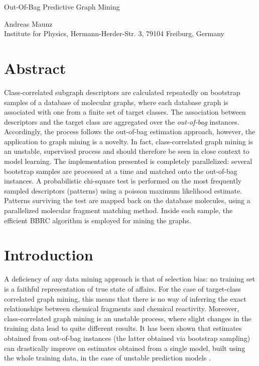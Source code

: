 \documentclass{article}
\begin{document}

\begin{center}
\begin{huge}Out-Of-Bag Predictive Graph Mining\end{huge}

Andreas Maunz \\Institute for Physics, Hermann-Herder-Str. 3, 79104 Freiburg, Germany
\end{center}

\section{Abstract}
Class-correlated subgraph descriptors are calculated repeatedly on bootstrap samples of a database of molecular graphs, where each database graph is associated with one from a finite set of target classes. 
The association between descriptors and the target class are aggregated over the \emph{out-of-bag} instances. Accordingly, the process follows the out-of-bag estimation approach, however, the application to graph mining is a novelty. 
In fact, class-correlated graph mining is an unstable, supervised process and should therefore be seen in close context to model learning.
The implementation presented is completely parallelized: several bootstrap samples are processed at a time and matched onto the out-of-bag instances. 
A probabilistic chi-square test is performed on the most frequently sampled descriptors (patterns) using a poisson maximum likelihood estimate.
Patterns surviving the test are mapped back on the database molecules, using a parallelized molecular fragment matching method.
Inside each sample, the efficient BBRC algorithm is employed for mining the graphs. 

\section{Introduction}
A deficiency of any data mining approach is that of selection bias: no training set is a faithful representation of true state of affairs. For the case of target-class correlated graph mining, this means that there is no way of inferring the exact relationships between chemical fragments and chemical reactivity. Moreover, class-correlated graph mining is an unstable process, where slight changes in the training data lead to quite different results. 
It has been shown that estimates obtained from out-of-bag instances (the latter obtained via bootstrap sampling) can drastically improve on estimates obtained from a single model, built using the whole training data, in the case of unstable prediction models \cite{breiman96oob}.
\end{document}
